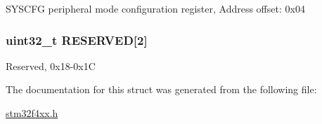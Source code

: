 S\-Y\-S\-C\-F\-G peripheral mode configuration register, Address offset\-: 0x04 \hypertarget{struct_s_y_s_c_f_g___type_def_afaf27b66c1edc60064db3fa6e693fb59}{
\subsubsection[{R\-E\-S\-E\-R\-V\-E\-D}]{\setlength{\rightskip}{0pt plus 5cm}uint32\-\_\-t R\-E\-S\-E\-R\-V\-E\-D\mbox{[}2\mbox{]}}}\label{struct_s_y_s_c_f_g___type_def_afaf27b66c1edc60064db3fa6e693fb59}
Reserved, 0x18-\/0x1\-C 

The documentation for this struct was generated from the following file\-:\begin{DoxyCompactItemize}
\item 
\hyperlink{stm32f4xx_8h}{stm32f4xx.\-h}\end{DoxyCompactItemize}
